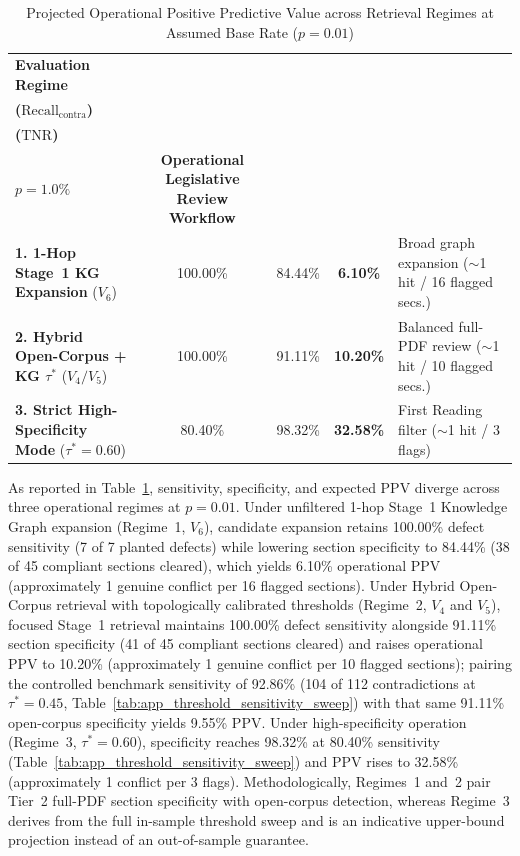\begin{table}[htbp]
    \centering
    \footnotesize
    \renewcommand{\arraystretch}{0.88}
    \caption[Operational PPV under Statutory Preemption Base-Rate Shift]{Projected Operational Positive Predictive Value across Retrieval Regimes at Assumed Base Rate ($p = 0.01$)}
    \label{tab:bayesian_ppv_prevalence_scenarios}
    \begin{tabularx}{\linewidth}{>{\RaggedRight\arraybackslash}p{4.6cm}ccc>{\RaggedRight\arraybackslash}X}
        \toprule
        \textbf{Evaluation Regime} & \shortstack[c]{\textbf{Sensitivity}\\\textbf{($\text{Recall}_{\text{contra}}$)}} & \shortstack[c]{\textbf{Specificity}\\\textbf{($\text{TNR}$)}} & \shortstack[c]{\textbf{PPV at}\\\textbf{$p = 1.0\%$}} & \textbf{Operational Legislative Review Workflow} \\
        \midrule
        \textbf{1. 1-Hop Stage~1 KG Expansion} ($V_6$) & 100.00\% & 84.44\% & \textbf{6.10\%} & Broad graph expansion ($\sim$1 hit / 16 flagged secs.) \\
        \textbf{2. Hybrid Open-Corpus + KG $\tau^*$} ($V_4 / V_5$) & 100.00\% & 91.11\% & \textbf{10.20\%} & Balanced full-PDF review ($\sim$1 hit / 10 flagged secs.) \\
        \textbf{3. Strict High-Specificity Mode} ($\tau^* = 0.60$) & 80.40\% & 98.32\% & \textbf{32.58\%} & First Reading filter ($\sim$1 hit / 3 flags) \\
        \bottomrule
    \end{tabularx}
\end{table}

As reported in Table~\ref{tab:bayesian_ppv_prevalence_scenarios}, sensitivity, specificity, and expected PPV diverge across three operational regimes at $p = 0.01$. Under unfiltered 1-hop Stage~1 Knowledge Graph expansion (Regime~1, $V_6$), candidate expansion retains 100.00\% defect sensitivity (7 of 7 planted defects) while lowering section specificity to 84.44\% (38 of 45 compliant sections cleared), which yields 6.10\% operational PPV (approximately 1 genuine conflict per 16 flagged sections). Under Hybrid Open-Corpus retrieval with topologically calibrated thresholds (Regime~2, $V_4$ and $V_5$), focused Stage~1 retrieval maintains 100.00\% defect sensitivity alongside 91.11\% section specificity (41 of 45 compliant sections cleared) and raises operational PPV to 10.20\% (approximately 1 genuine conflict per 10 flagged sections); pairing the controlled benchmark sensitivity of 92.86\% (104 of 112 contradictions at $\tau^* = 0.45$, Table~\ref{tab:app_threshold_sensitivity_sweep}) with that same 91.11\% open-corpus specificity yields 9.55\% PPV. Under high-specificity operation (Regime~3, $\tau^* = 0.60$), specificity reaches 98.32\% at 80.40\% sensitivity (Table~\ref{tab:app_threshold_sensitivity_sweep}) and PPV rises to 32.58\% (approximately 1 conflict per 3 flags). Methodologically, Regimes~1 and~2 pair Tier~2 full-PDF section specificity with open-corpus detection, whereas Regime~3 derives from the full in-sample threshold sweep and is an indicative upper-bound projection instead of an out-of-sample guarantee.

